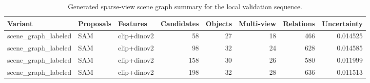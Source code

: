\begin{table}[t]
\centering
\caption{Generated sparse-view scene graph summary for the local validation sequence.}
\label{tab:generated_scene_graph_summary}
\begin{tabular}{lllrrrrr}
\toprule
Variant & Proposals & Features & Candidates & Objects & Multi-view & Relations & Uncertainty \\
\midrule
scene\_graph\_labeled & SAM & clip+dinov2 & 58 & 27 & 18 & 466 & 0.014525 \\
scene\_graph\_labeled & SAM & clip+dinov2 & 98 & 32 & 24 & 628 & 0.014585 \\
scene\_graph\_labeled & SAM & clip+dinov2 & 158 & 30 & 26 & 580 & 0.011999 \\
scene\_graph\_labeled & SAM & clip+dinov2 & 198 & 32 & 28 & 636 & 0.011513 \\
\bottomrule
\end{tabular}
\end{table}
